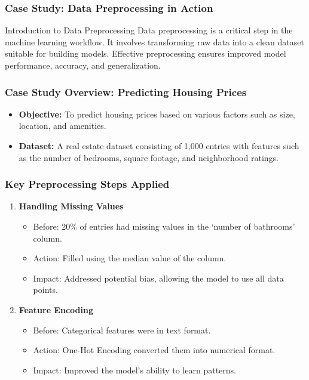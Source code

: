 \documentclass[aspectratio=169]{beamer}
\begin{document}
\begin{frame}[fragile]
    \frametitle{Case Study: Data Preprocessing in Action}
    \begin{block}{Introduction to Data Preprocessing}
        Data preprocessing is a critical step in the machine learning workflow. It involves transforming raw data into a clean dataset suitable for building models. Effective preprocessing ensures improved model performance, accuracy, and generalization.
    \end{block}
\end{frame}

\begin{frame}[fragile]
    \frametitle{Case Study Overview: Predicting Housing Prices}
    \begin{itemize}
        \item \textbf{Objective:} To predict housing prices based on various factors such as size, location, and amenities.
        \item \textbf{Dataset:} A real estate dataset consisting of 1,000 entries with features such as the number of bedrooms, square footage, and neighborhood ratings.
    \end{itemize}
\end{frame}

\begin{frame}[fragile]
    \frametitle{Key Preprocessing Steps Applied}
    \begin{enumerate}
        \item \textbf{Handling Missing Values}
            \begin{itemize}
                \item Before: 20\% of entries had missing values in the ‘number of bathrooms’ column.
                \item Action: Filled using the median value of the column.
                \item Impact: Addressed potential bias, allowing the model to use all data points.
            \end{itemize}
        \item \textbf{Feature Encoding}
            \begin{itemize}
                \item Before: Categorical features were in text format.
                \item Action: One-Hot Encoding converted them into numerical format.
                \item Impact: Improved the model's ability to learn patterns.
            \end{itemize}
    \end{enumerate}
\end{frame}
\end{document}
